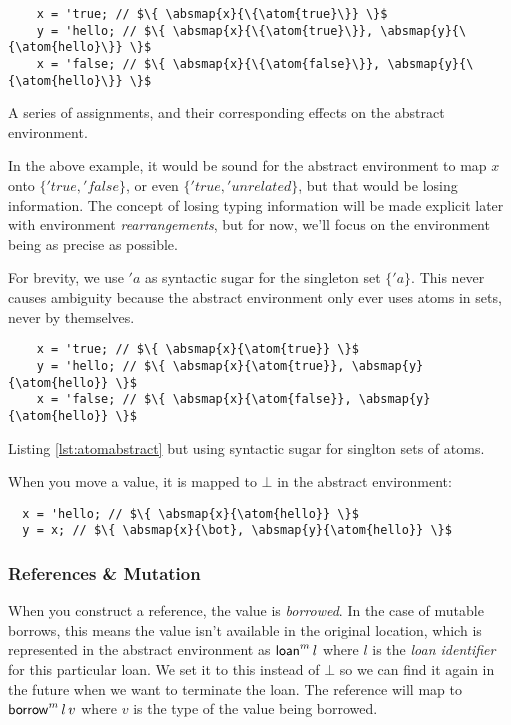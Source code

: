 \documentclass[12pt,twoside]{report}
\begin{document}
\begin{listing}[H]
  \begin{verbatim}
    x = 'true; // $\{ \absmap{x}{\{\atom{true}\}} \}$
    y = 'hello; // $\{ \absmap{x}{\{\atom{true}\}}, \absmap{y}{\{\atom{hello}\}} \}$
    x = 'false; // $\{ \absmap{x}{\{\atom{false}\}}, \absmap{y}{\{\atom{hello}\}} \}$
  \end{verbatim}
  \caption{A series of assignments, and their corresponding effects on the abstract environment.}
  \label{lst:atomabstract}
\end{listing}

In the above example, it would be sound for the abstract environment to map $x$ onto $\{'true, 'false\}$, or even $\{'true, 'unrelated\}$, but that would be losing information. The concept of losing typing information will be made explicit later with environment \textit{rearrangements}, but for now, we'll focus on the environment being as precise as possible.

For brevity, we use $'a$ as syntactic sugar for the singleton set $\{'a\}$. This never causes ambiguity because the abstract environment only ever uses atoms in sets, never by themselves.

\begin{listing}[H]
  \begin{verbatim}
    x = 'true; // $\{ \absmap{x}{\atom{true}} \}$
    y = 'hello; // $\{ \absmap{x}{\atom{true}}, \absmap{y}{\atom{hello}} \}$
    x = 'false; // $\{ \absmap{x}{\atom{false}}, \absmap{y}{\atom{hello}} \}$
  \end{verbatim}
  \caption{Listing \ref{lst:atomabstract} but using syntactic sugar for singlton sets of atoms.}
\end{listing}

When you move a value, it is mapped to $\bot$ in the abstract environment:

\begin{verbatim}
  x = 'hello; // $\{ \absmap{x}{\atom{hello}} \}$
  y = x; // $\{ \absmap{x}{\bot}, \absmap{y}{\atom{hello}} \}$
\end{verbatim}

\subsubsection{References \& Mutation}

When you construct a reference, the value is \textit{borrowed}. In the case of mutable borrows, this means the value isn't available in the original location, which is represented in the abstract environment as $\mathsf{loan}^m \, l$ where $l$ is the \textit{loan identifier} for this particular loan. We set it to this instead of $\bot$ so we can find it again in the future when we want to terminate the loan. The reference will map to $\mathsf{borrow}^m \, l \, v$ where $v$ is the type of the value being borrowed.
\end{document}
